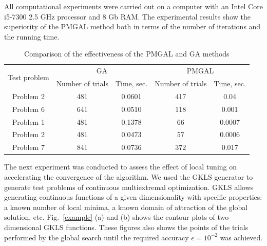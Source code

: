 \documentclass[
11pt,%
tightenlines,%
twoside,%
onecolumn,%
nofloats,%
nobibnotes,%
nofootinbib,%
superscriptaddress,%
noshowpacs,%
centertags]%
{revtex4}
\begin{document}
All computational experiments were carried out on a computer with an Intel Core i5-7300 2.5 GHz processor and 8 Gb RAM. The experimental results show the superiority of the PMGAL method both in terms of the number of iterations and the running time.

\begin{table}[ht]
    \caption{Comparison of the effectiveness of the PMGAL and GA methods}
    \label{tab:1}
    \center
    \begin{tabular}{|c|c|c|c|c|}
        \hline
    \multirow{2}{*}{Test problem}    & \multicolumn{2}{c|}{ GA } &  \multicolumn{2}{c|}{PMGAL} \\
        \cline{2-3} \cline{4-5}
         & Number of trials & Time, sec. &  Number of trials & Time, sec.  \\
        \hline
         Problem 2 \cite{Floudas}&  481 &   0.0601 &    417 &   0.04 \\
         Problem 6 \cite{Floudas}&  641 &   0.0510 &    118 &   0.001 \\
         Problem 1 \cite{Deep}   &  481 &   0.1378 &    66 &    0.0007 \\
         Problem 2 \cite{Deep}   &  481 &   0.0473 &    57 &    0.0006 \\
         Problem 7 \cite{Deep}   &  841 &   0.0736 &  372    &  0.017 \\
        \hline
    \end{tabular}
\end{table}


The next experiment was conducted to assess the effect of local tuning on accelerating the convergence of the algorithm. We used the GKLS generator \cite{Gaviano} to generate test problems of continuous multiextremal optimization. GKLS allows generating continuous functions of a given dimensionality with specific properties: a known number of local minima, a known domain of attraction of the global solution, etc.
Fig.~\ref{example} (a) and (b) shows the contour plots of two-dimensional GKLS functions. These figures also shows the points of the trials performed by the global search until the required accuracy $\epsilon=10^{-2}$ was achieved.
\end{document}
